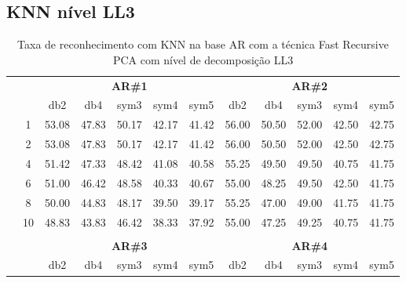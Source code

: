 \begin{table}[H]
\begin{tabular}{|c|c|c c c c c|}
\\\midrule
\end{tabular}
\end{table} %


\subsection{KNN nível LL3}

\begin{table}[H]
	\centering
    \normalsize
	\caption{Taxa de reconhecimento com KNN na base AR com a técnica Fast Recursive PCA com nível de decomposição LL3}
	\begin{tabular}{|c|c|c c c c c|c c c c c|}
\cline{3-12}
\multicolumn{2}{c|}{\multirow{2}{*}{}} & \multicolumn{5}{c|}{\textbf{AR\#1}}  & \multicolumn{5}{c|}{\textbf{AR\#2}} \\\cline{3-12}

\multicolumn{2}{c|}{}  & db2 & db4 & sym3 & sym4 & sym5 & db2 & db4& sym3 & sym4 & sym5 \\\hline

\multicolumn{1}{|c|}{ \multirow{5}{*}{\rotatebox[origin=c]{90}{\textbf{K-vizinhos}}} }
&1	&53.08	&47.83	&50.17	&42.17	&41.42	&56.00	&50.50	&52.00	&42.50	&42.75 \\\cline{2-12}
&2	&53.08	&47.83	&50.17	&42.17	&41.42	&56.00	&50.50	&52.00	&42.50	&42.75 \\\cline{2-12}
&4	&51.42	&47.33	&48.42	&41.08	&40.58	&55.25	&49.50	&49.50	&40.75	&41.75 \\\cline{2-12}
&6	&51.00	&46.42	&48.58	&40.33	&40.67	&55.00	&48.25	&49.50	&42.50	&41.75 \\\cline{2-12}
&8	&50.00	&44.83	&48.17	&39.50	&39.17	&55.25	&47.00	&49.00	&41.75	&41.75 \\\cline{2-12}
&10	&48.83	&43.83	&46.42	&38.33	&37.92	&55.00	&47.25	&49.25	&40.75	&41.75 \\ \midrule
\multicolumn{12}{c}{}\\ 




\cline{3-12}
\multicolumn{2}{c}{} & \multicolumn{5}{|c|}{\textbf{AR\#3}}  & \multicolumn{5}{c|}{\textbf{AR\#4}} \\\cline{3-12}
\multicolumn{2}{c}{}  & \multicolumn{1}{|c}{db2} & db4 & sym3 & sym4 & sym5 & db2 & db4& sym3 & sym4 & sym5 \\\hline


\end{tabular}
\end{table}
